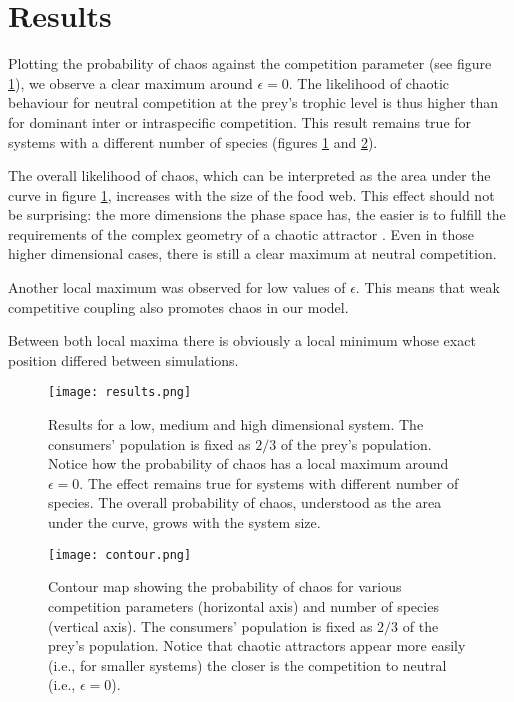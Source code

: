 \section{Results}
\label{sec:Results}
Plotting the probability of chaos against the competition parameter (see figure \ref{fig:Results}), we observe a clear maximum around $ \epsilon = 0 $. The likelihood of chaotic behaviour for neutral competition at the prey's trophic level is thus higher than for dominant inter or intraspecific competition. This result remains true for systems with a different number of species (figures \ref{fig:Results} and \ref{fig:Contour}).

The overall likelihood of chaos, which can be interpreted as the area under the curve in figure \ref{fig:Results}, increases with the size of the food web. This effect should not be surprising: the more dimensions the phase space has, the easier is to fulfill the requirements of the complex geometry of a chaotic attractor \cite{Strogatz1994}. Even in those higher dimensional cases, there is still a clear maximum at neutral competition.

Another local maximum was observed for low values of $ \epsilon $. This means that weak competitive coupling also promotes chaos in our model.

Between both local maxima there is obviously a local minimum whose exact position differed between simulations.

\begin{figure}
	\begin{center}
		\texttt{[image: results.png]}
	\end{center}
	\caption{Results for a low, medium and high dimensional system. The consumers' population is fixed as $ 2/3 $ of the prey's population. Notice how the probability of chaos has a local maximum around $\epsilon = 0$. The effect remains true for systems with different number of species. The overall probability of chaos, understood as the area under the curve, grows with the system size. }
	\label{fig:Results}
\end{figure}

\begin{figure}
	\begin{center}
		\texttt{[image: contour.png]}
	\end{center}
	\caption{Contour map showing the probability of chaos for various competition parameters (horizontal axis) and number of species (vertical axis). The consumers' population is fixed as $ 2/3 $ of the prey's population. Notice that chaotic attractors appear more easily (i.e., for smaller systems) the closer is the competition to neutral (i.e., $ \epsilon = 0 $).}
	\label{fig:Contour}
\end{figure}